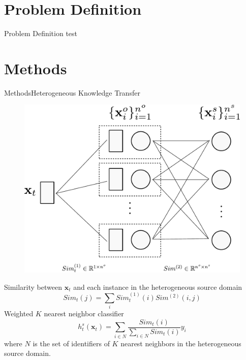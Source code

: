\documentclass{beamer}
\begin{document}
\section{Problem Definition}
\begin{frame}{Problem Definition}
test
\end{frame}

\section{Methods}
\begin{frame}{Methods}{Heterogeneous Knowledge Transfer}
\begin{figure}
\centering
\includegraphics[height=0.15\textwidth]{knowledgetransfer.pdf}
\end{figure}
Similarity between $\mathbf{x}_t$ and each instance in the heterogeneous source domain
$$ Sim_t(j) = \sum\limits_i Sim_{t}^{(1)}(i) Sim^{(2)}(i,j) $$
Weighted $K$ nearest neighbor classifier
$$ h_{t}^{s}(\mathbf{x}_t) = \sum\limits_{i \in N} \frac{Sim_t(i)}{\sum\limits_{i \in N} Sim_t(i)} y_i $$
where $N$ is the set of identifiers of $K$ nearest neighbors in the heterogeneous source domain.
\end{frame}
\end{document}
